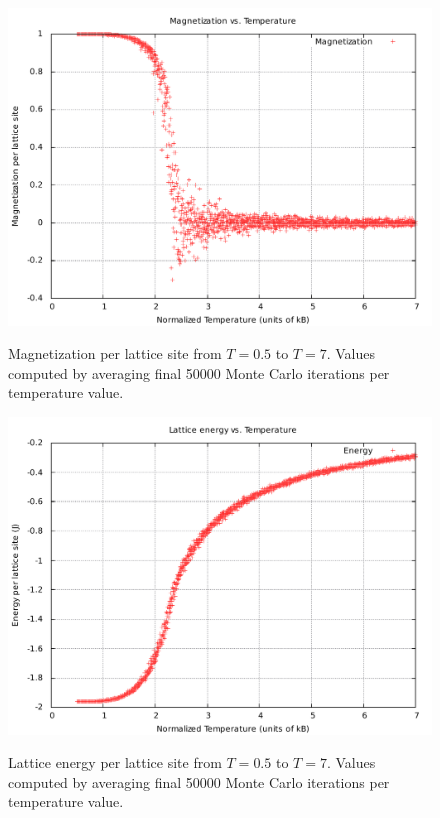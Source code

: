\documentclass[]{article}
\begin{document}
\begin{figure}[ht!]
 \centering
 \includegraphics[width=\linewidth]{figures/mag_vs_temp.pdf}
 \label{fig:mag_vs_temp}
 \caption{Magnetization per lattice site from $T=0.5$ to $T=7$. Values computed by averaging final 50000 Monte Carlo iterations per temperature value.}
\end{figure}

\begin{figure}[ht!]
 \centering
 \includegraphics[width=\linewidth]{figures/energy_vs_temp.pdf}
 \label{fig:energy_vs_temp}
 \caption{Lattice energy per lattice site from $T=0.5$ to $T=7$. Values computed by averaging final 50000 Monte Carlo iterations per temperature value.}
\end{figure}
\end{document}
